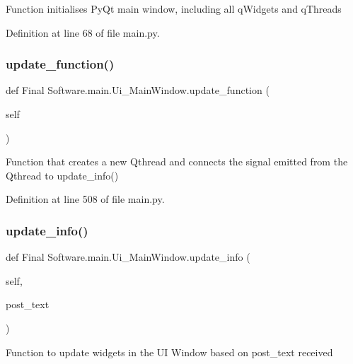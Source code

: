 \begin{DoxyVerb}Function initialises PyQt main window, including all qWidgets and qThreads
\end{DoxyVerb}
 

Definition at line 68 of file main.\+py.

\mbox{\label{class_final_01_software_1_1main_1_1_ui___main_window_ad768e063e8d23a9156b263c84346457c}} 
\subsubsection{update\_function()}
{\footnotesize\ttfamily def Final Software.\+main.\+Ui\+\_\+\+Main\+Window.\+update\+\_\+function (\begin{DoxyParamCaption}\item[{}]{self }\end{DoxyParamCaption})}

\begin{DoxyVerb}Function that creates a new Qthread and
connects the signal emitted from the Qthread 
to update_info()
\end{DoxyVerb}
 

Definition at line 508 of file main.\+py.

\mbox{\label{class_final_01_software_1_1main_1_1_ui___main_window_a9a38cea36daac921aba46c3768252895}} 
\subsubsection{update\_info()}
{\footnotesize\ttfamily def Final Software.\+main.\+Ui\+\_\+\+Main\+Window.\+update\+\_\+info (\begin{DoxyParamCaption}\item[{}]{self,  }\item[{}]{post\+\_\+text }\end{DoxyParamCaption})}

\begin{DoxyVerb}Function to update widgets in the UI Window
based on post_text received
\end{DoxyVerb}
 

